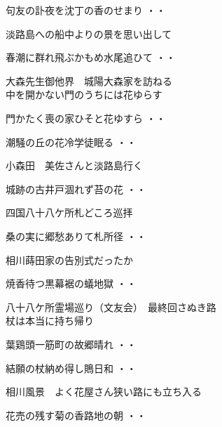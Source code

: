 \begin{shiika}句友の訃夜を沈丁の香のせまり
\hfill{・・}\end{shiika}
\vspace{0.6cm}
淡路島への船中よりの景を思い出して
\begin{shiika}春潮に群れ飛ぶかもめ水尾追ひて
\hfill{・・}\end{shiika}
\vspace{0.6cm}
大森先生御他界　城陽大森家を訪ねる
\\中を開かない門のうちには花ゆらす
\vspace{0.6cm}
\begin{shiika}門かたく喪の家ひそと花ゆすら
\hfill{・・}\end{shiika}
\vspace{0.6cm}
\begin{shiika}潮騒の丘の花冷学徒眠る
\hfill{・・}\end{shiika}
\vspace{0.6cm}
小森田　美佐さんと淡路島行く
\begin{shiika}城跡の古井戸涸れず苔の花
\hfill{・・}\end{shiika}
\vspace{0.6cm}
四国八十八ケ所札どころ巡拝
\begin{shiika}桑の実に郷愁ありて札所径
\hfill{・・}\end{shiika}
\vspace{0.6cm}
相川蒔田家の告別式だったか
\begin{shiika}焼香待つ黒幕裾の蟻地獄
\hfill{・・}\end{shiika}
\vspace{0.6cm}
八十八ケ所霊場巡り（文友会）　最終回さぬき路\\杖は本当に持ち帰り
\begin{shiika}葉鶏頭一筋町の故郷晴れ
\hfill{・・}\end{shiika}
\begin{shiika}結願の杖納め得し鵙日和
\hfill{・・}\end{shiika}
\vspace{0.6cm}
相川風景　よく花屋さん狭い路にも立ち入る
\begin{shiika}花売の残す菊の香路地の朝
\hfill{・・}\end{shiika}
